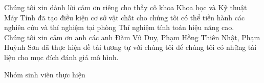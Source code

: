 \documentclass[12pt,a4paper,oneside]{book} %
\begin{document}
Chúng tôi xin dành lời cảm ơn riêng cho thầy cô khoa Khoa học và Kỹ thuật Máy Tính đã tạo điều kiện cơ sở vật chất cho chúng tôi có thể tiền hành các nghiên cứu và thí nghiệm tại phòng Thí nghiệm tính toán hiệu năng cao. \\

Chúng tôi xin cảm ơn anh các anh Đàm Vũ Duy, Phạm Hồng Thiên Nhật, Phạm Huỳnh Sơn đã thực hiện đề tài tương tự với chúng tôi để chúng tôi có những tài liệu cho mục đích đánh giá mô hình.
\begin{flushright}
Nhóm sinh viên thực hiện
\end{flushright}
\tableofcontents
\listoftables
\listoffigures


\mainmatter

\fancyhead{}  %
\renewcommand{\footrulewidth}{0.4pt}

\pagestyle{fancy}  %











{}

\end{document}
